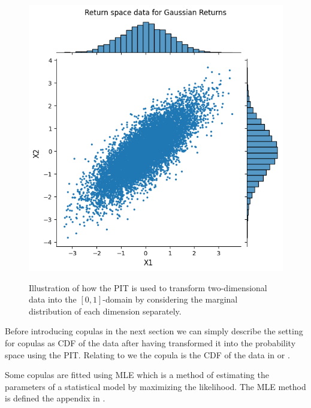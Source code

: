 \begin{figure}
\begin{minipage}{0.4\textwidth}
        \includegraphics[width=\textwidth]{3Theory/pictures/GaussianRetScatter.png}
        \label{fig:CorrelatedUniformScatter}
    \end{minipage}
    \caption{Illustration of how the \gls{PIT} is used to transform two-dimensional data into the $[0,1]$-domain by considering the marginal distribution of each dimension separately.}
    \label{fig:PITonData}
\end{figure}

Before introducing copulas in the next section we can simply describe the setting for copulas as \gls{CDF} of the data after having transformed it into the probability space using the \gls{PIT}. Relating to  we the copula is the \gls{CDF} of the data in  or .

Some copulas are fitted using \gls{MLE} which is a method of estimating the parameters of a statistical model by maximizing the likelihood. The \gls{MLE} method is defined the appendix in .


